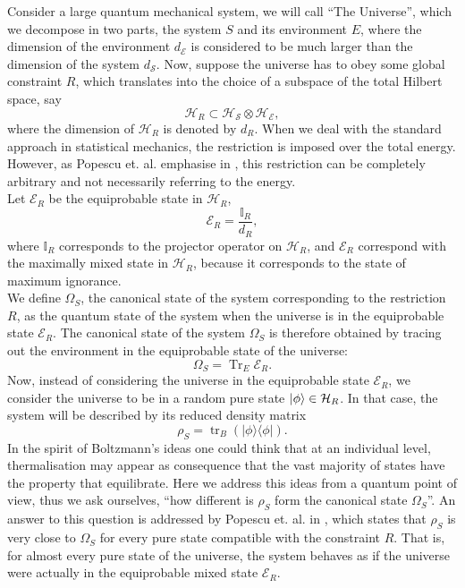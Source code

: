 \indent Consider a large quantum mechanical system, we will call ``The Universe'', which we decompose in two parts, the system $S$ and its environment $E$, where the dimension of the environment $d_{\mathcal{E}}$ is considered to be much larger than the  dimension of the system $d_{\mathcal{S}}$. Now, suppose the universe has to obey some global constraint $R$, which translates into the choice of a subspace of the total Hilbert space, say
 \begin{equation}
 \mathcal{H}_{R} \subset \mathcal{H}_{\mathcal{S}} \otimes \mathcal{H}_{\mathcal{E}},
 \label{CH1:Tipicality_1}
 \end{equation}
where the dimension of $\mathcal{H}_{R}$ is denoted  by  $d_R$. When we deal with the standard approach in statistical mechanics, the restriction is imposed over the total energy. However, as Popescu et. al. emphasise in \cite{popescu_entanglement_2006, popescu_foundations_2005}, this restriction can be completely arbitrary and not necessarily referring to the energy.\\
\indent Let $\mathcal{E}_R$ be the equiprobable state in $\mathcal{H}_{R}$,
\begin{equation}
\mathcal{E}_{R} = \frac{\mathbb{I}_R}{d_R},
\end{equation}
where $\mathbb{I}_R$ corresponds to the projector operator on $\mathcal{H}_R$, and $\mathcal{E}_R$ correspond with the maximally mixed state in $\mathcal{H}_R$, because it corresponds to the state of maximum ignorance.\\
\indent We define $\Omega_S$, the canonical state of the system corresponding to the restriction $R$, as the quantum state of the system when the universe is in the equiprobable state $\mathcal{E}_R$. The canonical state of the system $\Omega_S$ is therefore obtained by tracing out the environment in the equiprobable state of the universe:
\begin{equation}
\Omega_{S}=\operatorname{Tr}_{E} \mathcal{E}_{R}.
\label{CH1:Canonical_state}
\end{equation}
Now, instead of considering the universe in the equiprobable state $\mathcal{E}_R$, we consider the universe to be in a random pure state $\mathinner{|{\phi}\rangle}\in \mathcal{H}_R$. In that case, the system will be described by its reduced density matrix
\begin{equation}
\rho_{S}=\operatorname{tr}_{B}(|\phi\rangle\langle\phi|).
\label{CH1:Reduced_density_random_pure_state}
\end{equation}
In the spirit of Boltzmann's ideas one could think that at an individual level, thermalisation may appear as consequence that the vast majority of states have the property that equilibrate. Here we address this ideas from a quantum point of view, thus we ask ourselves, ``how different is $\rho_S$ form the canonical state $\Omega_S$''. An answer to this question is addressed by Popescu et. al. in \cite{popescu_entanglement_2006,popescu_foundations_2005}, which states that $\rho_S$ is very close to $\Omega_S$ for every pure state compatible with the constraint $R$. That is, for almost every pure state of the universe, the system behaves as if the universe were actually in the equiprobable mixed state $\mathcal{E}_R$. \\
